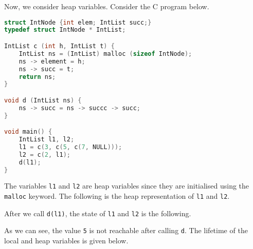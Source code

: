\documentclass[a4paper, openany]{memoir}
\begin{document}
Now, we consider heap variables. Consider the C program below.
\begin{lstlisting}[language=C]
struct IntNode {int elem; IntList succ;}
typedef struct IntNode * IntList;

IntList c (int h, IntList t) {
    IntList ns = (IntList) malloc (sizeof IntNode);
    ns -> element = h;
    ns -> succ = t;
    return ns;
}

void d (IntList ns) {
    ns -> succ = ns -> succc -> succ;
}

void main() {
    IntList l1, l2;
    l1 = c(3, c(5, c(7, NULL)));
    l2 = c(2, l1);
    d(l1);
}
\end{lstlisting}
The variables \texttt{l1} and \texttt{l2} are heap variables since they are initialised using the \texttt{malloc} keyword. The following is the heap representation of \texttt{l1} and \texttt{l2}.
\begin{figure}[H]
    \centering
\end{figure}
\noindent After we call \texttt{d(l1)}, the state of \texttt{l1} and \texttt{l2} is the following.
\begin{figure}[H]
    \centering
\end{figure}
\noindent As we can see, the value \texttt{5} is not reachable after calling \texttt{d}. The lifetime of the local and heap variables is given below.
\end{document}
